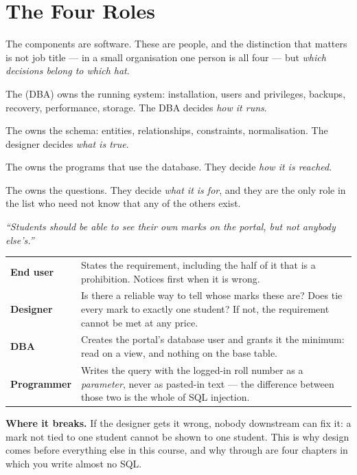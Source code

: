 \section{The Four Roles}

The components are software. These are people, and the distinction that
matters is not job title --- in a small organisation one person is all four ---
but \emph{which decisions belong to which hat}.

\begin{definitionbox}
The  (DBA) owns the running system: installation,
users and privileges, backups, recovery, performance, storage. The DBA decides
\emph{how it runs}.

\smallskip
The  owns the schema: entities, relationships,
constraints, normalisation. The designer decides \emph{what is true}.

\smallskip
The  owns the programs that use the database.
They decide \emph{how it is reached}.

\smallskip
The  owns the questions. They decide \emph{what it is for}, and
they are the only role in the list who need not know that any of the others
exist.
\end{definitionbox}

\begin{examplebox}
\emph{``Students should be able to see their own marks on the portal, but not
anybody else's.''}

\begin{tabular}{@{}L{3.1cm}L{10.9cm}@{}}
\textbf{End user} & States the requirement, including the half of it that is a
prohibition. Notices first when it is wrong. \\
\textbf{Designer} & Is there a reliable way to tell whose marks these are?
Does  tie
every mark to exactly one student? If not, the requirement cannot be met at
any price. \\
\textbf{DBA} & Creates the portal's database user and grants it the minimum:
read on a view, and nothing on the base table. \\
\textbf{Programmer} & Writes the query with the logged-in roll number as a
\emph{parameter}, never as pasted-in text --- the difference between those
two is the whole of SQL injection. \\
\end{tabular}

\smallskip
\textbf{Where it breaks.} If the designer gets it wrong, nobody downstream can
fix it: a mark not tied to one student cannot be shown to one student. This is
why design comes before everything else in this course, and why
 through  are four chapters in which you
write almost no SQL.
\end{examplebox}


